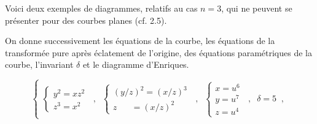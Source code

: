 Voici deux exemples de diagrammes, relatifs au cas $n = 3$, qui ne peuvent se présenter pour des courbes planes (cf. 2.5).

On donne successivement les équations de la courbe, les équations
de la transformée pure après éclatement de l'origine, des équations paramétriques de la courbe, l'invariant $\delta$ et le diagramme d'Enriques.

\begin{equation}\tag{2.25.1}
\left\{
\begin{array}{l}
\left\{\begin{array}{l} y^{2} = xz^{2} \\ z^{3} = x^{2} \end{array}\right. \;\;,\;\;
\left\{\begin{array}{l} (y/z)^{2} = (x/z)^{3} \\ z \;\;\;\;\;\; = (x/z)^{2} \end{array}\right. \;\;,\;\;
\left\{\begin{array}{l} x = u^{6} \\ y = u^{7} \\ z = u^{4} \end{array}\right. \;\;,\;\; \delta = 5 \;\;,
\end{array}
\right.
\end{equation}
\begin{center}
\end{center}
